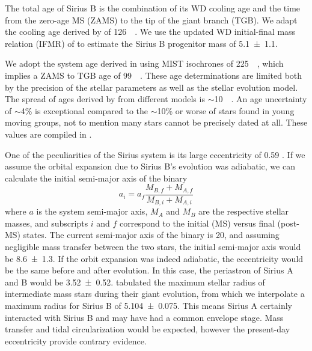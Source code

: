 \documentclass[twocolumn]{aastex631}
\begin{document}
The total age of Sirius B is the combination of its WD cooling age and the time from the zero-age MS (ZAMS) to the tip of the giant branch (TGB). We adapt the cooling age derived by \citet[sec. 8]{bondSiriusSystemIts2017} of \qty{126}{\mega\year}. We use the updated WD initial-final mass relation (IFMR) of \citet{cummingsWhiteDwarfInitialFinal2018} to estimate the Sirius B progenitor mass of \qty{5.1\pm1.1}{\solarmass}.

We adopt the system age derived in \citet{cummingsWhiteDwarfInitialFinal2018} using MIST isochrones of \qty{225}{\mega\year}, which implies a ZAMS to TGB age of \qty{99}{\mega\year}. These age determinations are limited both by the precision of the stellar parameters as well as the stellar evolution model. The spread of ages derived by \citet{cummingsWhiteDwarfInitialFinal2018} from different models is $\sim$\qty{10}{\mega\year}. An age uncertainty of $\sim$4\% is exceptional compared to the $\sim$10\% or worse of stars found in young moving groups, not to mention many stars cannot be precisely dated at all. These values are compiled in .


One of the peculiarities of the Sirius system is its large eccentricity of 0.59 \citep{bondSiriusSystemIts2017}. If we assume the orbital expansion due to Sirius B's evolution was adiabatic, we can calculate the initial semi-major axis of the binary
\begin{equation}
    a_i = a_f \frac{M_{B,f} + M_{A,f}}{M_{B,i} + M_{A,i}}
\end{equation}
where $a$ is the system semi-major axis, $M_A$ and $M_B$ are the respective stellar masses, and subscripts $i$ and $f$ correspond to the initial (MS) versus final (post-MS) states. The current semi-major axis of the binary is \qty{20}{\au}, and assuming negligible mass transfer between the two stars, the initial semi-major axis would be \qty{8.6\pm1.3}{\au}. If the orbit expansion was indeed adiabatic, the eccentricity would be the same before and after evolution. In this case, the periastron of Sirius A and B would be \qty{3.52\pm0.52}{\au}. \citet{verasPostmainsequencePlanetarySystem2016} tabulated the maximum stellar radius of intermediate mass stars during their giant evolution, from which we interpolate a maximum radius for Sirius B of \qty{5.104\pm0.075}{\au}. This means Sirius A certainly interacted with Sirius B and may have had a common envelope stage. Mass transfer and tidal circularization would be expected, however the present-day eccentricity provide contrary evidence.
\end{document}
